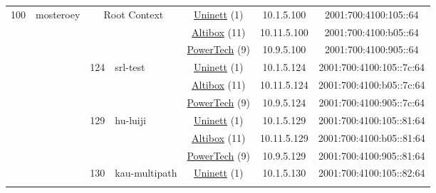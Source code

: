 \begin{small}
\begin{center}
\begin{longtable}{|c|c|c|c|c|c|c|c|}
 \multirow{30}{*}{\tiny{100}} & \multicolumn{1}{|l|}{\multirow{30}{*}{\tiny{mosteroey}}} & \multicolumn{2}{|c|}{\multirow{3}{*}{\tiny{Root Context}}} & \multicolumn{2}{|c|}{\tiny{\href{https://www.uninett.no}{Uninett} (1)}} & \tiny{10.1.5.100} & \tiny{2001:700:4100:105::64} \\* \cline{5-5}\cline{6-6}\cline{7-7}\cline{8-8}
  &  & \multicolumn{2}{|c|}{} & \multicolumn{2}{|c|}{\tiny{\href{https://www.altibox.no}{Altibox} (11)}} & \tiny{10.11.5.100} & \tiny{2001:700:4100:b05::64} \\* \cline{5-5}\cline{6-6}\cline{7-7}\cline{8-8}
  &  & \multicolumn{2}{|c|}{} & \multicolumn{2}{|c|}{\tiny{\href{http://www.powertech.no}{PowerTech} (9)}} & \tiny{10.9.5.100} & \tiny{2001:700:4100:905::64} \\* \cline{3-3}\cline{4-4}\cline{5-5}\cline{6-6}\cline{7-7}\cline{8-8}
  &  & \multirow{3}{*}{\tiny{124}} & \multicolumn{1}{|l|}{\multirow{3}{*}{\tiny{srl-test}}} & \multicolumn{2}{|c|}{\tiny{\href{https://www.uninett.no}{Uninett} (1)}} & \tiny{10.1.5.124} & \tiny{2001:700:4100:105::7c:64} \\* \cline{5-5}\cline{6-6}\cline{7-7}\cline{8-8}
  &  &  &  & \multicolumn{2}{|c|}{\tiny{\href{https://www.altibox.no}{Altibox} (11)}} & \tiny{10.11.5.124} & \tiny{2001:700:4100:b05::7c:64} \\* \cline{5-5}\cline{6-6}\cline{7-7}\cline{8-8}
  &  &  &  & \multicolumn{2}{|c|}{\tiny{\href{http://www.powertech.no}{PowerTech} (9)}} & \tiny{10.9.5.124} & \tiny{2001:700:4100:905::7c:64} \\* \cline{3-3}\cline{4-4}\cline{5-5}\cline{6-6}\cline{7-7}\cline{8-8}
  &  & \multirow{3}{*}{\tiny{129}} & \multicolumn{1}{|l|}{\multirow{3}{*}{\tiny{hu-luiji}}} & \multicolumn{2}{|c|}{\tiny{\href{https://www.uninett.no}{Uninett} (1)}} & \tiny{10.1.5.129} & \tiny{2001:700:4100:105::81:64} \\* \cline{5-5}\cline{6-6}\cline{7-7}\cline{8-8}
  &  &  &  & \multicolumn{2}{|c|}{\tiny{\href{https://www.altibox.no}{Altibox} (11)}} & \tiny{10.11.5.129} & \tiny{2001:700:4100:b05::81:64} \\* \cline{5-5}\cline{6-6}\cline{7-7}\cline{8-8}
  &  &  &  & \multicolumn{2}{|c|}{\tiny{\href{http://www.powertech.no}{PowerTech} (9)}} & \tiny{10.9.5.129} & \tiny{2001:700:4100:905::81:64} \\* \cline{3-3}\cline{4-4}\cline{5-5}\cline{6-6}\cline{7-7}\cline{8-8}
  &  & \multirow{3}{*}{\tiny{130}} & \multicolumn{1}{|l|}{\multirow{3}{*}{\tiny{kau-multipath}}} & \multicolumn{2}{|c|}{\tiny{\href{https://www.uninett.no}{Uninett} (1)}} & \tiny{10.1.5.130} & \tiny{2001:700:4100:105::82:64} \\* \cline{5-5}\cline{6-6}\cline{7-7}\cline{8-8}

\end{longtable}
\end{center}
\end{small}

